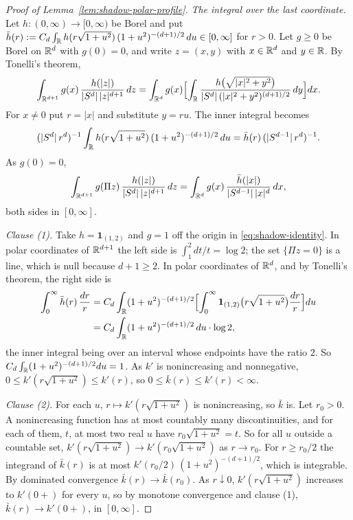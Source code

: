 \begin{proof}[Proof of Lemma~\ref{lem:shadow-polar-profile}]
\emph{The integral over the last coordinate.} Let $h : (0,\infty) \to [0,\infty)$ be Borel and
put $\bar h(r) := C_d\int_{\mathbb{R}}h(r\sqrt{1+u^2})\,(1+u^2)^{-(d+1)/2}\,du \in [0,\infty]$ for
$r > 0$. Let $g \ge 0$ be Borel on $\mathbb{R}^d$ with $g(0) = 0$, and write $z = (x,y)$ with
$x \in \mathbb{R}^d$ and $y \in \mathbb{R}$. By Tonelli's theorem,
\[
  \int_{\mathbb{R}^{d+1}} g(x)\,\frac{h(|z|)}{|S^{d}|\,|z|^{d+1}}\,dz
   = \int_{\mathbb{R}^d} g(x)\Bigl[\int_{\mathbb{R}}
       \frac{h\bigl(\sqrt{|x|^2+y^2}\bigr)}{|S^{d}|\,(|x|^2+y^2)^{(d+1)/2}}\,dy\Bigr]dx .
\]
For $x \ne 0$ put $r = |x|$ and substitute $y = ru$. The inner integral becomes
\[
  (|S^{d}|\,r^{d})^{-1}\int_{\mathbb{R}}h(r\sqrt{1+u^2})\,(1+u^2)^{-(d+1)/2}\,du =
  \bar h(r)\,(|S^{d-1}|\,r^{d})^{-1} .
\]
As $g(0) = 0$,
\begin{equation}\label{eq:shadow-identity}
  \int_{\mathbb{R}^{d+1}} g(\Pi z)\,\frac{h(|z|)}{|S^{d}|\,|z|^{d+1}}\,dz
   = \int_{\mathbb{R}^d} g(x)\,\frac{\bar h(|x|)}{|S^{d-1}|\,|x|^{d}}\,dx ,
\end{equation}
both sides in $[0,\infty]$.

\emph{Clause (1).} Take $h = \mathbf 1_{(1,2)}$ and $g = 1$ off the origin in
\ref{eq:shadow-identity}. In polar coordinates of $\mathbb{R}^{d+1}$ the left side is
$\int_1^2 dt/t = \log 2$; the set $\{\Pi z = 0\}$ is a line, which is null because $d + 1 \ge 2$.
In polar coordinates of $\mathbb{R}^d$, and by Tonelli's theorem, the right side is
\[
\begin{aligned}
  \int_0^\infty \bar h(r)\,\frac{dr}{r}
   &= C_d\int_{\mathbb{R}}(1+u^2)^{-(d+1)/2}\Bigl[\int_0^\infty
       \mathbf 1_{(1,2)}\bigl(r\sqrt{1+u^2}\bigr)\frac{dr}{r}\Bigr]du \\
   &= C_d\int_{\mathbb{R}}(1+u^2)^{-(d+1)/2}\,du\cdot\log 2 ,
\end{aligned}
\]
the inner integral being over an interval whose endpoints have the ratio $2$. So
$C_d\int_{\mathbb{R}}(1+u^2)^{-(d+1)/2}du = 1$. As $k'$ is nonincreasing and nonnegative,
$0 \le k'(r\sqrt{1+u^2}) \le k'(r)$, so $0 \le \bar k(r) \le k'(r) < \infty$.

\emph{Clause (2).} For each $u$, $r \mapsto k'(r\sqrt{1+u^2})$ is nonincreasing, so $\bar k$ is.
Let $r_0 > 0$. A nonincreasing function has at most countably many discontinuities, and for each
of them, $t$, at most two real $u$ have $r_0\sqrt{1+u^2} = t$. So for all $u$ outside a countable
set, $k'(r\sqrt{1+u^2}) \to k'(r_0\sqrt{1+u^2})$ as $r \to r_0$. For $r \ge r_0/2$ the integrand
of $\bar k(r)$ is at most $k'(r_0/2)\,(1+u^2)^{-(d+1)/2}$, which is integrable. By dominated
convergence $\bar k(r) \to \bar k(r_0)$. As $r \downarrow 0$, $k'(r\sqrt{1+u^2})$ increases to
$k'(0{+})$ for every $u$, so by monotone convergence and clause (1),
$\bar k(r) \to k'(0{+})$, in $[0,\infty]$.


\end{proof}
